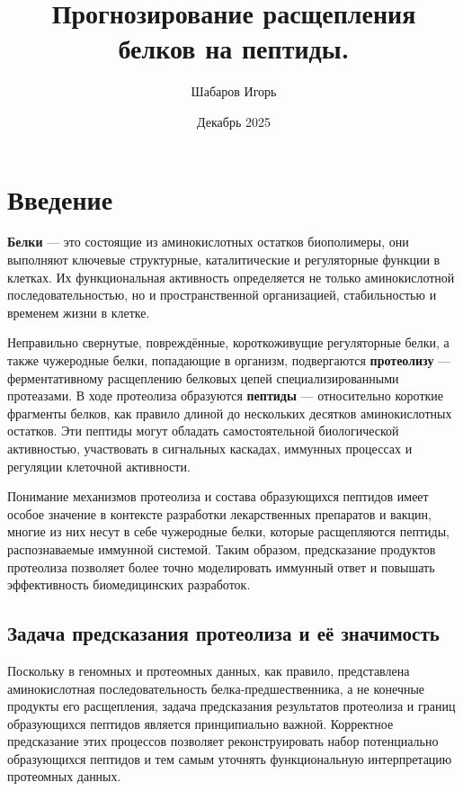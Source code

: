 \documentclass{article}
\title{Прогнозирование расщепления \\белков на пептиды.}
\author{Шабаров Игорь}
\date{Декабрь 2025}
\begin{document}
\maketitle

\section{Введение}
\textbf{Белки} — это состоящие из аминокислотных остатков биополимеры, они выполняют ключевые структурные, каталитические и регуляторные функции в клетках. Их функциональная активность определяется не только аминокислотной последовательностью, но и пространственной организацией, стабильностью и временем жизни в клетке.

Неправильно свернутые, повреждённые, короткоживущие регуляторные белки, а также чужеродные белки, попадающие в организм, подвергаются \textbf{протеолизу} — ферментативному расщеплению белковых цепей специализированными протеазами. В ходе протеолиза образуются \textbf{пептиды} — относительно короткие фрагменты белков, как правило длиной до нескольких десятков аминокислотных остатков. Эти пептиды могут обладать самостоятельной биологической активностью, участвовать в сигнальных каскадах, иммунных процессах и регуляции клеточной активности.

Понимание механизмов протеолиза и состава образующихся пептидов имеет особое значение в контексте разработки лекарственных препаратов и вакцин, многие из них несут в себе чужеродные белки, которые расщепляются пептиды, распознаваемые иммунной системой. Таким образом, предсказание продуктов протеолиза позволяет более точно моделировать иммунный ответ и повышать эффективность биомедицинских разработок.

\subsection{Задача предсказания протеолиза и её значимость}
Поскольку в геномных и протеомных данных, как правило, представлена аминокислотная последовательность белка-предшественника, а не конечные продукты его расщепления, задача предсказания результатов протеолиза и границ образующихся пептидов является принципиально важной. Корректное предсказание этих процессов позволяет реконструировать набор потенциально образующихся пептидов и тем самым уточнять функциональную интерпретацию протеомных данных.
\end{document}
